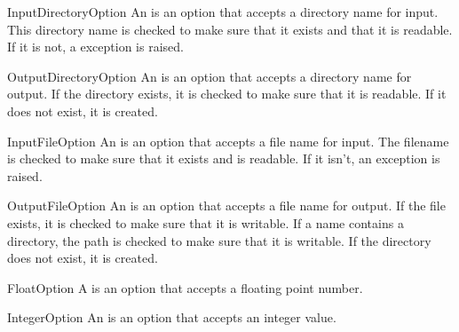 \documentclass{manual}
\begin{document}
\begin{classdesc}{InputDirectoryOption}{}
An  is an option that accepts a directory name
for input.
This directory name is checked to make sure that it exists and that it is
readable.  If it is not, a  exception is 
raised.
\end{classdesc}

\begin{classdesc}{OutputDirectoryOption}{}
An  is an option that accepts a directory name
for output.  If the directory exists, it is checked to make sure that it is
readable.  If it does not exist, it is created.
\end{classdesc}

\begin{classdesc}{InputFileOption}{}
An  is an option that accepts a file name for input.
The filename is checked to make sure that it exists and is readable.  If
it isn't, an  exception is raised.
\end{classdesc}

\begin{classdesc}{OutputFileOption}{}
An  is an option that accepts a file name for output.
If the file exists, it is checked to make sure that it is writable.  
If a name contains a directory, the path is checked to make sure that it is 
writable.  If the directory does not exist, it is created. 
\end{classdesc}

\begin{classdesc}{FloatOption}{}
A  is an option that accepts a floating point number.
\end{classdesc}

\begin{classdesc}{IntegerOption}{}
An  is an option that accepts an integer value.
\end{classdesc}
\end{document}
